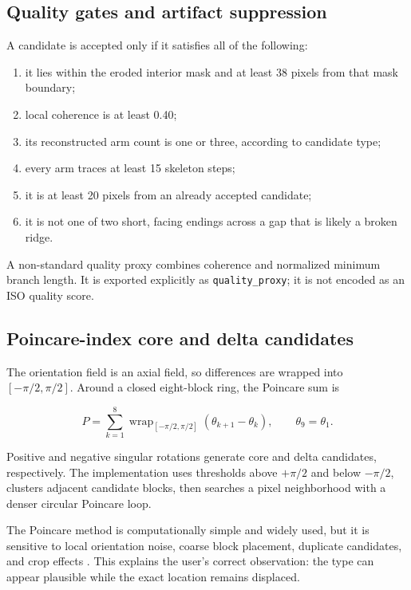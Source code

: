 \documentclass[11pt]{article}
\begin{document}
\subsection{Quality gates and artifact suppression}

A candidate is accepted only if it satisfies all of the following:

\begin{enumerate}
  \item it lies within the eroded interior mask and at least 38 pixels from that mask boundary;
  \item local coherence is at least 0.40;
  \item its reconstructed arm count is one or three, according to candidate type;
  \item every arm traces at least 15 skeleton steps;
  \item it is at least 20 pixels from an already accepted candidate;
  \item it is not one of two short, facing endings across a gap that is likely a broken ridge.
\end{enumerate}

A non-standard quality proxy combines coherence and normalized minimum branch length. It is exported explicitly as \texttt{quality\_proxy}; it is not encoded as an ISO quality score.

\subsection{Poincare-index core and delta candidates}

The orientation field is an axial field, so differences are wrapped into $[-\pi/2,\pi/2]$. Around a closed eight-block ring, the Poincare sum is

\begin{equation}
P = \sum_{k=1}^{8}\operatorname{wrap}_{[-\pi/2,\pi/2]}
(\theta_{k+1}-\theta_k), \qquad \theta_9=\theta_1.
\end{equation}

Positive and negative singular rotations generate core and delta candidates, respectively. The implementation uses thresholds above $+\pi/2$ and below $-\pi/2$, clusters adjacent candidate blocks, then searches a pixel neighborhood with a denser circular Poincare loop.

The Poincare method is computationally simple and widely used, but it is sensitive to local orientation noise, coarse block placement, duplicate candidates, and crop effects \cite{bazen2002directional,ohtsuka2007core}. This explains the user's correct observation: the type can appear plausible while the exact location remains displaced.
\end{document}
